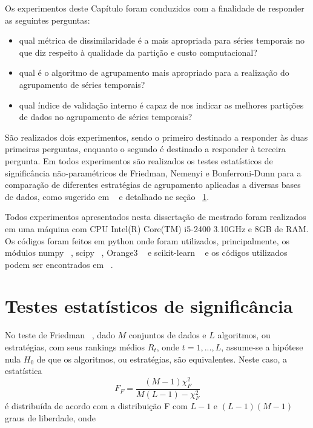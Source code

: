 Os experimentos deste Capítulo foram conduzidos com a finalidade de responder as seguintes perguntas:

\begin{itemize}
	\item qual métrica de dissimilaridade é a mais apropriada para séries temporais no que diz respeito à qualidade da partição e custo computacional?
	\item qual é o algoritmo de agrupamento mais apropriado para a realização do agrupamento de séries temporais?
	\item qual índice de validação interno é capaz de nos indicar as melhores partições de dados no agrupamento de séries temporais?
\end{itemize}

São realizados dois experimentos, sendo o primeiro destinado a responder às duas primeiras perguntas, enquanto o segundo é destinado a responder à terceira pergunta. Em todos experimentos são realizados os testes estatísticos de significância não-paramétricos de Friedman, Nemenyi e Bonferroni-Dunn para a comparação de diferentes estratégias de agrupamento aplicadas a diversas bases de dados, como sugerido em ~\parencite{Demsar} e detalhado ne seção ~\ref{sec:testes_estatisticos}.

Todos experimentos apresentados nesta dissertação de mestrado foram realizados em uma máquina com CPU  Intel(R) Core(TM) i5-2400 3.10GHz e 8GB de RAM. Os códigos foram feitos em python onde foram utilizados, principalmente, os módulos numpy ~\parencite{numpy}, scipy ~\parencite{scipy}, Orange3 ~\parencite{JMLR:demsar13a} e scikit-learn ~\parencite{scikit-learn} e os códigos utilizados podem ser encontrados em ~\parencite{codigo_fonte}.

\section{Testes estatísticos de significância} \label{sec:testes_estatisticos}

No teste de Friedman ~\parencite{Friedman1940Comparison}, dado $M$ conjuntos de dados e $L$ algoritmos, ou estratégias, com seus rankings médios $R_t$, onde $t=1,...,L$, assume-se a hipótese nula $H_0$ de que os algoritmos, ou estratégias, são equivalentes. Neste caso, a estatística
\begin{equation}
F_F = \frac{(M-1)\chi_{F}^{2}}{M(L-1)-\chi_{F}^{2}}
\end{equation} \label{eq:Friedman_F}
é distribuída de acordo com a distribuição F com $L-1$ e $(L-1)(M-1)$ graus de liberdade, onde 

